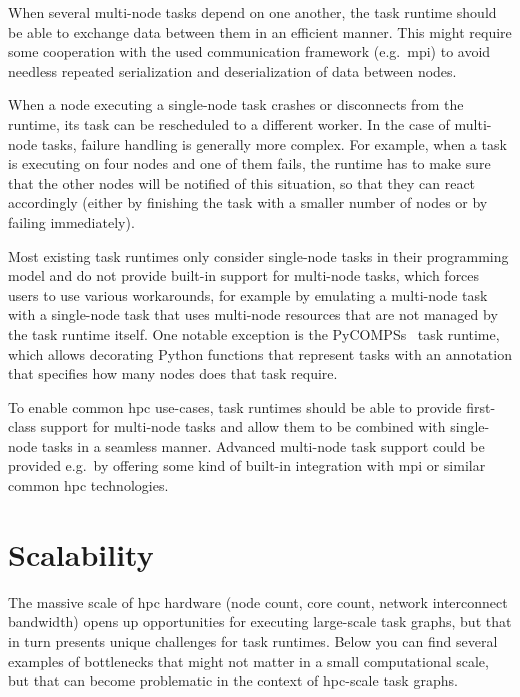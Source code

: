 \begin{description}[wide=0pt]
		When several multi-node tasks depend on one another, the task runtime should be able to exchange
		data between them in an efficient manner. This might require some cooperation with the used
		communication framework (e.g.\ \gls{mpi}) to avoid needless repeated serialization
		and deserialization of data between nodes.
	\item[Fault tolerance] When a node executing a single-node task crashes or disconnects from the runtime, its task can be
		rescheduled to a different worker. In the case of multi-node tasks, failure handling is generally
		more complex. For example, when a task is executing on four nodes and one of them fails, the
		runtime has to make sure that the other nodes will be notified of this situation, so that they can
		react accordingly (either by finishing the task with a smaller number of nodes or by failing
		immediately).
\end{description}

Most existing task runtimes only consider single-node tasks in their programming model and do not
provide built-in support for multi-node tasks, which forces users to use various workarounds, for
example by emulating a multi-node task with a single-node task that uses multi-node resources that
are not managed by the task runtime itself. One notable exception is the
PyCOMPSs~\cite{pycompss} task runtime, which allows decorating Python functions that
represent tasks with an annotation that specifies how many nodes does that task require.

To enable common \gls{hpc} use-cases, task runtimes should be able to provide
first-class support for multi-node tasks and allow them to be combined with single-node tasks in a
seamless manner. Advanced multi-node task support could be provided e.g.\ by offering some kind of
built-in integration with \gls{mpi} or similar common \gls{hpc}
technologies.

\section{Scalability}
The massive scale of \gls{hpc} hardware (node count, core count, network
interconnect bandwidth) opens up opportunities for executing large-scale task graphs, but that in
turn presents unique challenges for task runtimes. Below you can find several examples of
bottlenecks that might not matter in a small computational scale, but that can become problematic
in the context of \gls{hpc}-scale task graphs.

